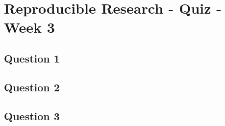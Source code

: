 \documentclass[french]{article}
\begin{document}
\section*{Reproducible Research - Quiz - Week 3}
\subsection*{Question 1}

\newpage
\subsection*{Question 2}


\newpage
\subsection*{Question 3}
\end{document}
